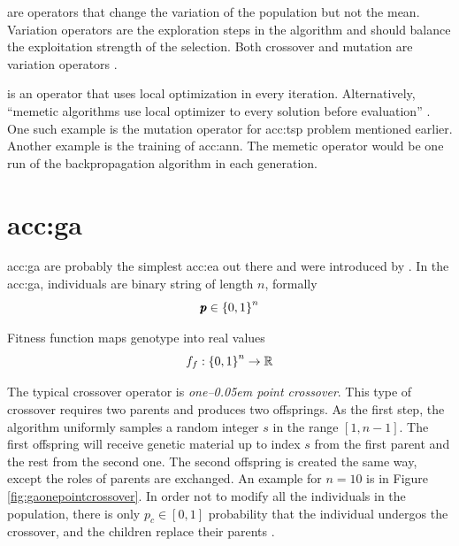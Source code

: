  are operators that change the variation of the population but not the mean. Variation operators are the exploration steps in the algorithm and should balance the exploitation strength of the selection. Both crossover and mutation are variation operators \citep{SelfAdaptiveFeaturesInRealParameterEvolutionaryAlgorithms}.

 is an operator that uses local optimization in every iteration. Alternatively, \enquote{memetic algorithms use local optimizer to every solution before evaluation} \citep{HowToSolveItModernHeuristics}. One such example is the mutation operator for \acrlong{acc:tsp} problem mentioned earlier. Another example is the training of \acrshort{acc:ann}. The memetic operator would be one run of the backpropagation algorithm in each generation.




\section{\texorpdfstring{\acrlong*{acc:ga}}{Genetic Algorithms}}

\acrfull{acc:ga} are probably the simplest \acrfull{acc:ea} out there and were introduced by \citet{HollandGA}. In the \acrshort{acc:ga}, individuals are binary string of length $n$, formally
$$ \pmb{p} \in \left\{0,1\right\}^{n} $$

Fitness function maps genotype into real values
$$ f_f:\left\{0,1\right\}^{n}\rightarrow\mathbb{R} $$

The typical crossover operator is \emph{one--\kern0.05em point crossover}. This type of crossover requires two parents and produces two offsprings. As the first step, the algorithm uniformly samples a random integer $s$ in the range $\left[ 1, n-1 \right]$. The first offspring will receive genetic material up to index $s$ from the first parent and the rest from the second one. The second offspring is created the same way, except the roles of parents are exchanged. An example for $n=10$ is in Figure \ref{fig:gaonepointcrossover}. In order not to modify all the individuals in the population, there is only $p_c\in\left[0,1\right]$ probability that the individual undergos the crossover, and the children replace their parents \citep{IntroductionToEA}.

